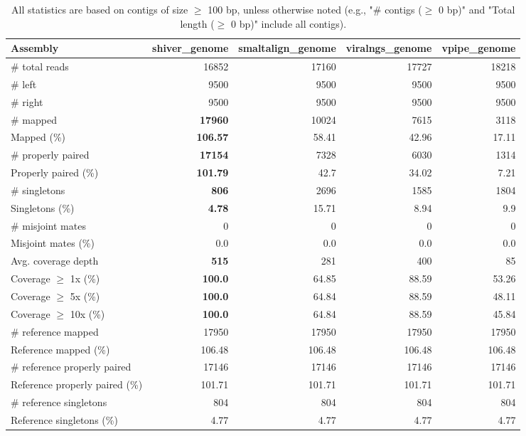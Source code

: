 \documentclass[12pt,a4paper]{article}
\begin{document}
\begin{table}[ht]
\begin{center}
\caption{All statistics are based on contigs of size $\geq$ 100 bp, unless otherwise noted (e.g., "\# contigs ($\geq$ 0 bp)" and "Total length ($\geq$ 0 bp)" include all contigs).}
\begin{tabular}{|l*{4}{|r}|}
\hline
Assembly & shiver\_genome & smaltalign\_genome & viralngs\_genome & vpipe\_genome \\ \hline
\# total reads & 16852 & 17160 & 17727 & 18218 \\ \hline
\# left & 9500 & 9500 & 9500 & 9500 \\ \hline
\# right & 9500 & 9500 & 9500 & 9500 \\ \hline
\# mapped & {\bf 17960} & 10024 & 7615 & 3118 \\ \hline
Mapped (\%) & {\bf 106.57} & 58.41 & 42.96 & 17.11 \\ \hline
\# properly paired & {\bf 17154} & 7328 & 6030 & 1314 \\ \hline
Properly paired (\%) & {\bf 101.79} & 42.7 & 34.02 & 7.21 \\ \hline
\# singletons & {\bf 806} & 2696 & 1585 & 1804 \\ \hline
Singletons (\%) & {\bf 4.78} & 15.71 & 8.94 & 9.9 \\ \hline
\# misjoint mates & 0 & 0 & 0 & 0 \\ \hline
Misjoint mates (\%) & 0.0 & 0.0 & 0.0 & 0.0 \\ \hline
Avg. coverage depth & {\bf 515} & 281 & 400 & 85 \\ \hline
Coverage $\geq$ 1x (\%) & {\bf 100.0} & 64.85 & 88.59 & 53.26 \\ \hline
Coverage $\geq$ 5x (\%) & {\bf 100.0} & 64.84 & 88.59 & 48.11 \\ \hline
Coverage $\geq$ 10x (\%) & {\bf 100.0} & 64.84 & 88.59 & 45.84 \\ \hline
\# reference mapped & 17950 & 17950 & 17950 & 17950 \\ \hline
Reference mapped (\%) & 106.48 & 106.48 & 106.48 & 106.48 \\ \hline
\# reference properly paired & 17146 & 17146 & 17146 & 17146 \\ \hline
Reference properly paired (\%) & 101.71 & 101.71 & 101.71 & 101.71 \\ \hline
\# reference singletons & 804 & 804 & 804 & 804 \\ \hline
Reference singletons (\%) & 4.77 & 4.77 & 4.77 & 4.77 \\ \hline

\end{tabular}
\end{center}
\end{table}
\end{document}
